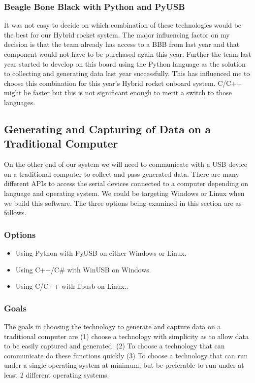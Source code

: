 \documentclass[10pt,draftclsnofoot,onecolumn,retainorgcmds]{IEEEtran}
\begin{document}
\subsubsection{Beagle Bone Black with Python and PyUSB}
It was not easy to decide on which combination of these technologies would be the best for our Hybrid rocket system. The major influencing factor on my decision is that the team already has access to a BBB from last year and that component would not have to be purchased again this year. Further the team last year started to develop on this board using the Python language as the solution to collecting and generating data last year successfully. This has influenced me to choose this combination for this year's Hybrid rocket onboard system. C/C++ might be faster but this is not significant enough to merit a switch to those languages.\par

\subsection{Generating and Capturing of Data on a Traditional Computer}
On the other end of our system we will need to communicate with a USB device on a traditional computer to collect and pass generated data. There are many different APIs to access the serial devices connected to a computer depending on language and operating system. We could be targeting Windows or Linux when we build this software. 
The three options being examined in this section are as follows. \\
\subsubsection{Options}
\begin{itemize}
	\item Using Python with PyUSB on either Windows or Linux.
	\item Using C++/C\# with WinUSB on Windows.
	\item Using C/C++ with libusb on Linux..\\
\end{itemize}
\subsubsection{Goals}
The goals in choosing the technology to generate and capture data on a traditional computer are (1) choose a technology with simplicity as to allow data to be easily captured and generated. (2) To choose a technology that can communicate do these functions quickly (3) To choose a technology that can run under a single operating system at minimum, but be preferable to run under at least 2 different operating systems. \\
\end{document}
